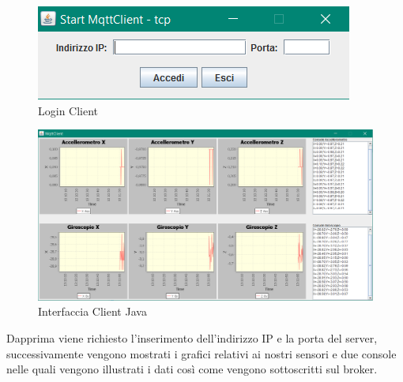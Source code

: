 \documentclass[]{scrartcl}
\begin{document}
\begin{figure}[h]
	\centering
	\includegraphics[scale=0.8]{login.jpg}
	\caption{Login Client}
\end{figure}
 \newpage
\begin{figure}[h]
	\centering
	\includegraphics[scale=0.3]{gui.png}
	\caption{Interfaccia Client Java}
\end{figure}

Dapprima viene richiesto l'inserimento dell'indirizzo IP e la porta del server, successivamente vengono mostrati i grafici relativi ai nostri sensori e due console nelle quali vengono illustrati i dati così come vengono sottoscritti sul broker.
\end{document}
